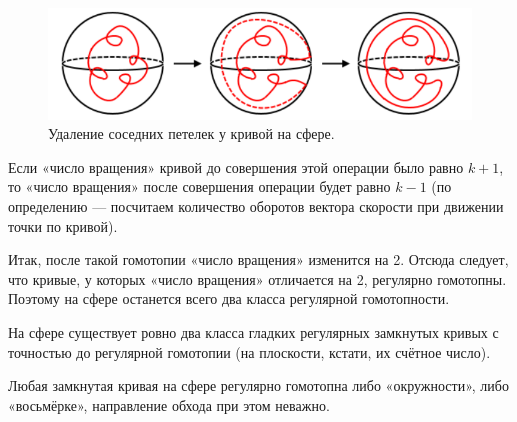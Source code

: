 \begin{figure}[ht]
    \centering
    \includegraphics[scale=0.7]{images/c13.6.png}
    \caption{Удаление соседних петелек у кривой на сфере.}
    \label{fig:c13.6}
\end{figure}

Если «число вращения» кривой до совершения этой операции было равно $k+1$, то «число вращения» после совершения операции будет равно $k-1$ (по определению — посчитаем количество оборотов вектора скорости при движении точки по кривой).

Итак, после такой гомотопии «число вращения» изменится на 2. Отсюда следует, что кривые, у которых «число вращения» отличается на 2, регулярно гомотопны. Поэтому на сфере останется всего два класса регулярной гомотопности.

\begin{statement}
    На сфере существует ровно два класса гладких регулярных замкнутых кривых с точностью до регулярной гомотопии (на плоскости, кстати, их счётное число).
\end{statement} 

\begin{theorem}
    Любая замкнутая кривая на сфере регулярно гомотопна либо «окружности», либо «восьмёрке», направление обхода при этом неважно.
\end{theorem} 
